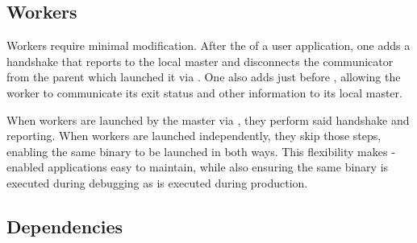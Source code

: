 \subsection{Workers}

Workers require minimal modification.
After the \mpiinit of a user application, one adds a handshake \jmhandshake that reports to the local master and disconnects the communicator from the parent which launched it via \spawn.
One also adds \jmfinish just before \mpifinalize, allowing the worker to communicate its exit status and other information to its local master.

When workers are launched by the master via \spawn, they perform said handshake and reporting.
When workers are launched independently, they skip those steps, enabling the same binary to be launched in both ways.
This flexibility makes \mpijm-enabled applications easy to maintain, while also ensuring the same binary is executed during debugging as is executed during production.

\subsection{Dependencies}

